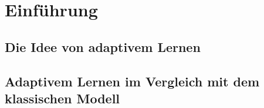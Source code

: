 \chapter{Einführung}

\section{Die Idee von adaptivem Lernen}

\section{Adaptivem Lernen im Vergleich mit dem klassischen Modell}

